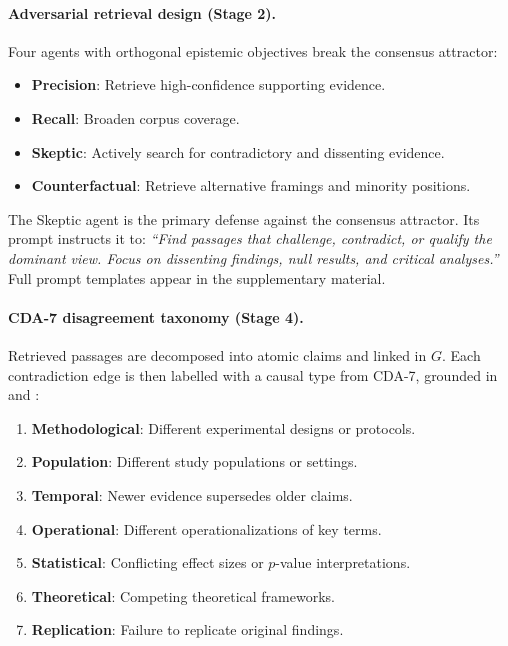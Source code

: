 \documentclass[11pt]{article}
\begin{document}
\paragraph{Adversarial retrieval design (Stage 2).}
Four agents with orthogonal epistemic objectives break the consensus attractor:
\begin{itemize}[leftmargin=*,nosep]
  \item \textbf{Precision}: Retrieve high-confidence supporting evidence.
  \item \textbf{Recall}: Broaden corpus coverage.
  \item \textbf{Skeptic}: Actively search for contradictory and dissenting evidence.
  \item \textbf{Counterfactual}: Retrieve alternative framings and minority positions.
\end{itemize}
The Skeptic agent is the primary defense against the consensus attractor.
Its prompt instructs it to: \textit{``Find passages that challenge, contradict,
or qualify the dominant view.  Focus on dissenting findings, null results, and
critical analyses.''}  Full prompt templates appear in the supplementary material.

\paragraph{CDA-7 disagreement taxonomy (Stage 4).}
\label{sec:cda7}
Retrieved passages are decomposed into atomic claims and linked in $G$.
Each contradiction edge is then labelled with a causal type from CDA-7,
grounded in \citet{longino2002science} and \citet{solomon2001social}:
\begin{enumerate}[leftmargin=*,nosep,label=\arabic{enumi}.]
  \item \textbf{Methodological}: Different experimental designs or protocols.
  \item \textbf{Population}: Different study populations or settings.
  \item \textbf{Temporal}: Newer evidence supersedes older claims.
  \item \textbf{Operational}: Different operationalizations of key terms.
  \item \textbf{Statistical}: Conflicting effect sizes or $p$-value interpretations.
  \item \textbf{Theoretical}: Competing theoretical frameworks.
  \item \textbf{Replication}: Failure to replicate original findings.
\end{enumerate}
\end{document}
